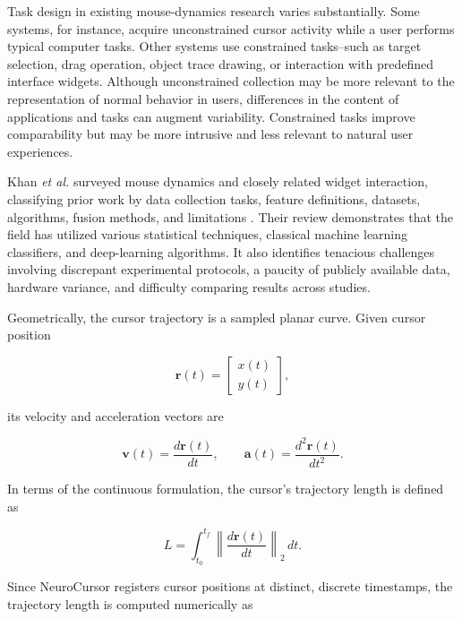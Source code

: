 \documentclass[conference]{IEEEtran}
\begin{document}
Task design in existing mouse-dynamics research varies substantially. Some systems, for instance, acquire unconstrained cursor activity while a user performs typical computer tasks. Other systems use constrained tasks--such as target selection, drag operation, object trace drawing, or interaction with predefined interface widgets. Although unconstrained collection may be more relevant to the representation of normal behavior in users, differences in the content of applications and tasks can augment variability. Constrained tasks improve comparability but may be more intrusive and less relevant to natural user experiences. 

Khan \textit{et al.} surveyed mouse dynamics and closely related widget interaction, classifying prior work by data collection tasks, feature definitions, datasets, algorithms, fusion methods, and limitations \cite{khanMouseSurvey}. Their review demonstrates that the field has utilized various statistical techniques, classical machine learning classifiers, and deep-learning algorithms. It also identifies tenacious challenges involving discrepant experimental protocols, a paucity of publicly available data, hardware variance, and difficulty comparing results across studies. 

Geometrically, the cursor trajectory is a sampled planar curve. Given cursor position 

\begin{equation}
\mathbf{r}(t)
=
\begin{bmatrix}
x(t)\\
y(t)
\end{bmatrix},
\end{equation}

its velocity and acceleration vectors are 

\begin{equation}
\mathbf{v}(t)
=
\frac{d\mathbf{r}(t)}{dt},
\qquad
\mathbf{a}(t)
=
\frac{d^2\mathbf{r}(t)}{dt^2}.
\end{equation}

In terms of the continuous formulation, the cursor's trajectory length is defined as

\begin{equation}
L
=
\int_{t_0}^{t_f}
\left\|
\frac{d\mathbf{r}(t)}{dt}
\right\|_2
\,dt.
\label{eq:continuous_path_length}
\end{equation}

Since NeuroCursor registers cursor positions at distinct, discrete timestamps, the trajectory length is computed numerically as 
\end{document}
